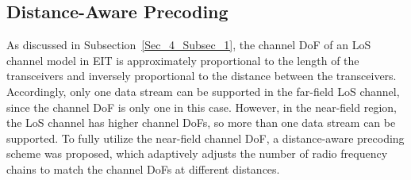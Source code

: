\documentclass[journal,twocolumn]{IEEEtran}
\begin{document}
\subsection{Distance-Aware Precoding}
As discussed in Subsection~\ref{Sec_4_Subsec_1}, the channel DoF of an LoS channel model in EIT is approximately proportional to the length of the transceivers and inversely proportional to the distance between the transceivers. 
Accordingly, only one data stream can be supported in the far-field LoS channel, since the channel DoF is only one in this case. 
However, in the near-field region, the LoS channel has higher channel DoFs, so more than one data stream can be supported.
To fully utilize the near-field channel DoF, a distance-aware precoding scheme was proposed, which adaptively adjusts the number of radio frequency chains to match the channel DoFs at different distances.   


\end{document}
